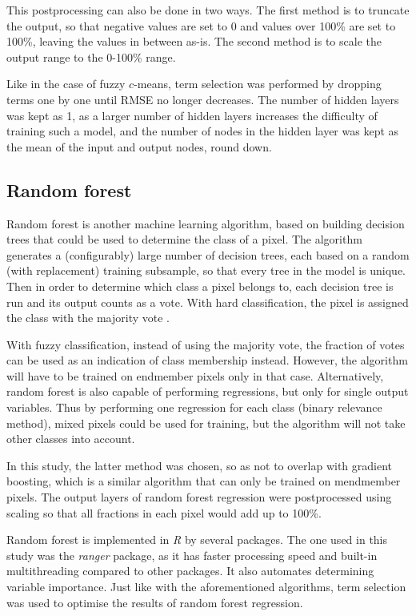 \documentclass[a4paper,10pt]{book}
\begin{document}
This postprocessing can also be done in two ways. The first method is to truncate the output, so that negative values are set to 0 and values over 100\% are set to 100\%, leaving the values in between as-is. The second method is to scale the output range to the 0-100\% range.

Like in the case of fuzzy $c$-means, term selection was performed by dropping terms one by one until RMSE no longer decreases. The number of hidden layers was kept as 1, as a larger number of hidden layers increases the difficulty of training such a model, and the number of nodes in the hidden layer was kept as the mean of the input and output nodes, round down.

\subsection{Random forest}

Random forest is another machine learning algorithm, based on building decision trees that could be used to determine the class of a pixel. The algorithm generates a (configurably) large number of decision trees, each based on a random (with replacement) training subsample, so that every tree in the model is unique. Then in order to determine which class a pixel belongs to, each decision tree is run and its output counts as a vote. With hard classification, the pixel is assigned the class with the majority vote \citep{walton2008subpixelrf}.

With fuzzy classification, instead of using the majority vote, the fraction of votes can be used as an indication of class membership instead. However, the algorithm will have to be trained on endmember pixels only in that case. Alternatively, random forest is also capable of performing regressions, but only for single output variables. Thus by performing one regression for each class (binary relevance method), mixed pixels could be used for training, but the algorithm will not take other classes into account.

In this study, the latter method was chosen, so as not to overlap with gradient boosting, which is a similar algorithm that can only be trained on mendmember pixels. The output layers of random forest regression were postprocessed using scaling so that all fractions in each pixel would add up to 100\%.

Random forest is implemented in \textit{R} by several packages. The one used in this study was the \textit{ranger} package, as it has faster processing speed and built-in multithreading compared to other packages. It also automates determining variable importance. Just like with the aforementioned algorithms, term selection was used to optimise the results of random forest regression.
\end{document}
